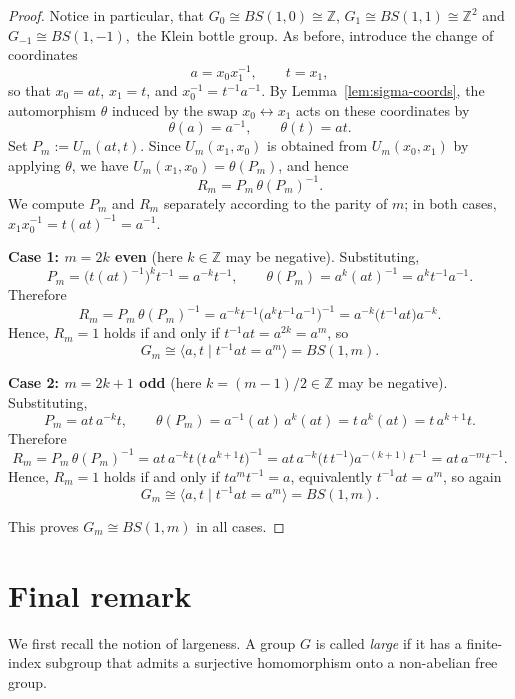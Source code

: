\documentclass[a4paper,12pt,oneside]{article}
\theoremstyle{definition}
\begin{document}
\begin{proof}
Notice in particular, that $G_0\cong BS(1,0)\cong\mathbb{Z}$, $G_1\cong BS(1,1)\cong\mathbb{Z}^2$ and $G_{-1}\cong BS(1,-1),$ the Klein bottle group. As before, introduce the change of coordinates
\[
a = x_0 x_1^{-1}, \qquad t = x_1,
\]
so that $x_0 = at$, $x_1 = t$, and $x_0^{-1} = t^{-1}a^{-1}$. By Lemma~\ref{lem:sigma-coords}, the automorphism $\theta$ induced by the swap $x_0 \leftrightarrow x_1$ acts on these coordinates by
\[
\theta(a) = a^{-1}, \qquad \theta(t) = at.
\]
Set $P_m := U_m(at,t)$. Since $U_m(x_1,x_0)$ is obtained from $U_m(x_0,x_1)$ by applying $\theta$, we have $U_m(x_1,x_0) = \theta(P_m)$, and hence
\[
R_m = P_m\,\theta(P_m)^{-1}.
\]
We compute $P_m$ and $R_m$ separately according to the parity of $m$; in both cases, $x_1 x_0^{-1} = t(at)^{-1} = a^{-1}$.

\smallskip
\noindent\textbf{Case 1: $m = 2k$ even} (here $k \in \mathbb{Z}$ may be negative). Substituting,
\[
P_m = \bigl(t(at)^{-1}\bigr)^k t^{-1} = a^{-k} t^{-1}, \qquad
\theta(P_m) = a^{k}(at)^{-1} = a^{k} t^{-1} a^{-1}.
\]
Therefore
\[
R_m = P_m\,\theta(P_m)^{-1}
= a^{-k}t^{-1}\bigl(a^{k}t^{-1}a^{-1}\bigr)^{-1}
= a^{-k}\bigl(t^{-1}at\bigr)a^{-k}.
\]
Hence,  $R_m = 1$ holds if and only if $t^{-1}at = a^{2k} = a^m$, so
\[
G_m \cong \langle a, t \mid t^{-1}at = a^m \rangle = BS(1,m).
\]

\smallskip
\noindent\textbf{Case 2: $m = 2k+1$ odd} (here $k = (m-1)/2 \in \mathbb{Z}$ may be negative). Substituting,
\[
P_m = at\,a^{-k}t, \qquad
\theta(P_m) = a^{-1}(at)\,a^{k}(at) = t\,a^{k}(at) = t\,a^{k+1}t.
\]
Therefore
\[
R_m = P_m\,\theta(P_m)^{-1}
= at\,a^{-k}t\,\bigl(t\,a^{k+1}t\bigr)^{-1}
= at\,a^{-k}\bigl(t\,t^{-1}\bigr)a^{-(k+1)}t^{-1}
= at\,a^{-m}t^{-1}.
\]
Hence,  $R_m = 1$ holds if and only if $t a^m t^{-1} = a$, equivalently $t^{-1}at = a^m$, so again
\[
G_m \cong \langle a, t \mid t^{-1}at = a^m \rangle = BS(1,m).
\]

\smallskip
This proves $G_m \cong BS(1,m)$ in all cases. 
\end{proof}

\section{Final remark}
\label{sec:conclusion}

We first recall the notion of largeness. A group \(G\) is called \emph{large} if it has a finite-index subgroup that admits a surjective homomorphism onto a non-abelian free group.
\end{document}
